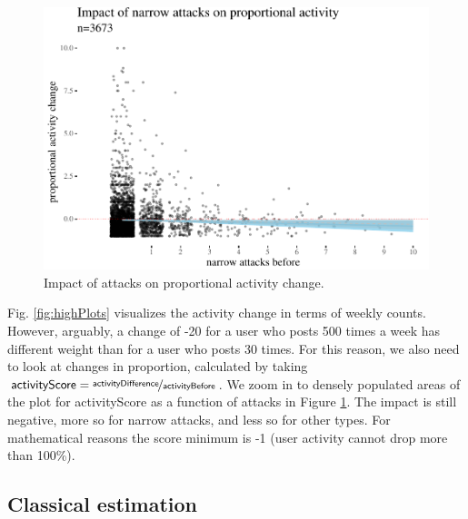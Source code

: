 \documentclass[10pt,dvipsnames]{scrartcl}
\begin{document}
\begin{figure}[H]

\begin{center}\includegraphics[width=1\linewidth]{quittingShortAbridgedRevisions3_files/figure-latex/unnamed-chunk-7-1} \end{center}
\caption{Impact of attacks  on proportional activity change.}
\label{fig:propActivity}
\end{figure}

Fig. \ref{fig:highPlots} visualizes the activity change in terms of
weekly counts. However, arguably, a change of -20 for a user who posts
500 times a week has different weight than for a user who posts 30
times. For this reason, we also need to look at changes in proportion,
calculated by taking
\(\mathsf{activityScore} = \nicefrac{\mathsf{activityDifference}}{\mathsf{activityBefore}}\).
We zoom in to densely populated areas of the plot for
\textsf{activityScore} as a function of attacks in Figure
\ref{fig:propActivity}. The impact is still negative, more so for
\textsf{narrow} attacks, and less so for other types. For mathematical
reasons the score minimum is -1 (user activity cannot drop more than
100\%).

\subsection{Classical estimation}
\end{document}
